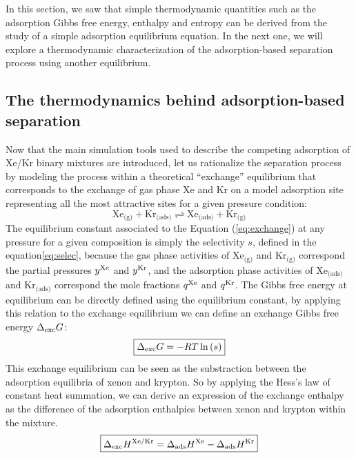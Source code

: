 \documentclass[main.tex]{subfiles}
\begin{document}
In this section, we saw that simple thermodynamic quantities such as the adsorption Gibbs free energy, enthalpy and entropy can  be derived from the study of a simple adsorption equilibrium equation. In the next one, we will explore a thermodynamic characterization of the adsorption-based separation process using another equilibrium. 

\subsection{The thermodynamics behind adsorption-based separation}\label{sct:thermo}

Now that the main simulation tools used to describe the competing adsorption of Xe/Kr binary mixtures are introduced, let us rationalize the separation process by modeling the process within a theoretical ``exchange'' equilibrium that corresponds to the exchange of gas phase Xe and Kr on a model adsorption site representing all the most attractive sites for a given pressure condition:
\begin{equation}\label{eq:exchange}
    \text{Xe}_{\text{(g)}} + \text{Kr}_{\text{(ads)}}
    \rightleftharpoons \text{Xe}_{\text{(ads)}} + \text{Kr}_{\text{(g)}}
\end{equation}
The equilibrium constant associated to the Equation (\ref{eq:exchange}) at any pressure for a given composition is simply the selectivity $s$, defined in the equation\ref{eq:selec}, because the gas phase activities of $\text{Xe}_{\text{(g)}}$ and $\text{Kr}_{\text{(g)}}$ correspond the partial pressures $y^{\text{Xe}}$ and $y^{\text{Kr}}$, and the adsorption phase activities of $\text{Xe}_{\text{(ads)}}$ and $\text{Kr}_{\text{(ads)}}$ correspond the mole fractions $q^{\text{Xe}}$ and $q^{\text{Kr}}$. The Gibbs free energy at equilibrium can be directly defined using the equilibrium constant, by applying this relation to the exchange equilibrium we can define an exchange Gibbs free energy $\Delta_{\text{exc}}G$:
\begin{equation}\label{eq:exc_gibbs_free_energy}
  \boxed{
  \Delta_{\text{exc}}G = -RT \ln\left(s\right)
  }
\end{equation}
This exchange equilibrium can be seen as the substraction between the adsorption equilibria of xenon and krypton. So by applying the Hess's law of constant heat summation, we can derive an expression of the exchange enthalpy as the difference of the adsorption enthalpies between xenon and krypton within the mixture. 
\begin{equation}
  \boxed{
  \Delta_{\text{exc}}H^{\text{Xe/Kr}} = \Delta_{\text{ads}}H^{\text{Xe}} - \Delta_{\text{ads}}H^{\text{Kr}}
  }
\end{equation}
\end{document}
